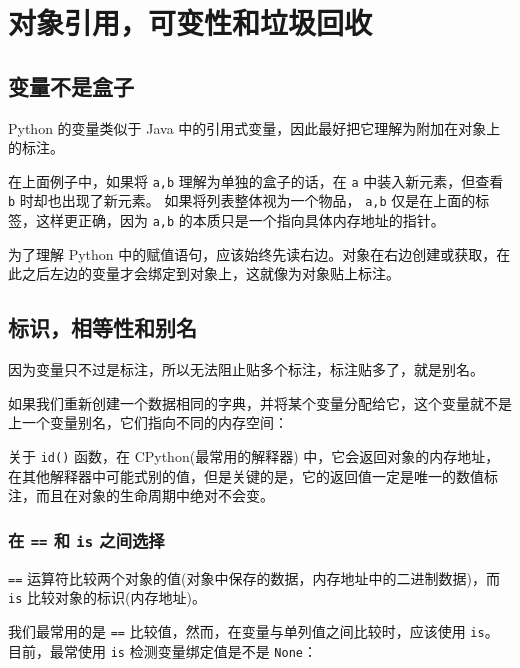 \section{对象引用，可变性和垃圾回收}
\subsection{变量不是盒子}

Python 的变量类似于 Java 中的引用式变量，因此最好把它理解为附加在对象上的标注。



在上面例子中，如果将 \texttt{a,b} 理解为单独的盒子的话，在 \texttt{a} 中装入新元素，但查看 \texttt{b} 时却也出现了新元素。 如果将列表整体视为一个物品， \texttt{a,b} 仅是在上面的标签，这样更正确，因为 \texttt{a,b} 的本质只是一个指向具体内存地址的指针。

为了理解 Python 中的赋值语句，应该始终先读右边。对象在右边创建或获取，在此之后左边的变量才会绑定到对象上，这就像为对象贴上标注。

\subsection{标识，相等性和别名}

因为变量只不过是标注，所以无法阻止贴多个标注，标注贴多了，就是别名。



如果我们重新创建一个数据相同的字典，并将某个变量分配给它，这个变量就不是上一个变量别名，它们指向不同的内存空间：



关于 \texttt{id()} 函数，在 CPython(最常用的解释器) 中，它会返回对象的内存地址，在其他解释器中可能式别的值，但是关键的是，它的返回值一定是唯一的数值标注，而且在对象的生命周期中绝对不会变。

\subsubsection{在 \texttt{==} 和 \texttt{is} 之间选择}

\texttt{==} 运算符比较两个对象的值(对象中保存的数据，内存地址中的二进制数据)，而 \texttt{is} 比较对象的标识(内存地址)。

我们最常用的是 \texttt{==} 比较值，然而，在变量与单列值之间比较时，应该使用 \texttt{is}。目前，最常使用 \texttt{is} 检测变量绑定值是不是 \texttt{None}：

